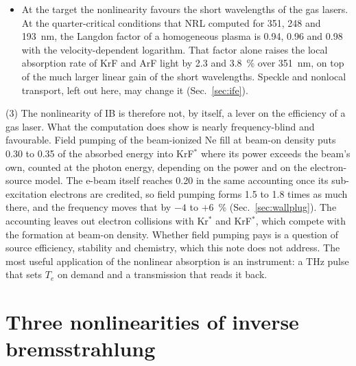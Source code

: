 \documentclass[11pt]{article}
\numberwithin{equation}{section}
\begin{document}
\begin{itemize}
  density it holds with that power the advantage is up to $\times1.24$ at a fixed beam
  current and $\times1.355$ at fixed $n_e$ (Sec.~\ref{sec:source}). The krypton
  share of a
  self-sustained discharge differs from its DC value by at most 1.5 percentage points
  in the Ne fill, and falls by up to ten points at high frequency in the Ar fill
  (Secs.~\ref{sec:share} and~\ref{sec:selfsus}).
\item At the target the nonlinearity favours the short wavelengths of the gas
  lasers. At the quarter-critical conditions that NRL computed for 351, 248 and
  193~nm, the Langdon factor of a homogeneous plasma is 0.94, 0.96 and 0.98 with the
  velocity-dependent logarithm. That factor alone raises the local absorption rate of
  KrF and ArF light by 2.3 and 3.8~\% over 351~nm, on top of the much larger linear
  gain of the short wavelengths. Speckle and nonlocal transport, left out here, may
  change it (Sec.~\ref{sec:ife}).
\end{itemize}

{\noindent}(3) The nonlinearity of IB is therefore not, by itself, a lever on
the efficiency of a gas laser. What the computation does show is nearly
frequency-blind and favourable. Field pumping of the beam-ionized Ne fill at beam-on
density puts 0.30 to 0.35 of the absorbed energy into KrF$^*$ where its power exceeds
the beam's own, counted at the photon energy, depending on the power and on the
electron-source model. The e-beam itself reaches 0.20 in the same accounting once its
sub-excitation electrons are credited, so field pumping forms 1.5 to 1.8 times as much
there, and the frequency moves that by $-4$ to $+6$~\% (Sec.~\ref{sec:wallplug}). The accounting leaves out electron collisions
with Kr$^*$ and KrF$^*$, which compete with the formation at beam-on density. Whether
field pumping pays is a question of source efficiency, stability and chemistry, which
this note does not address. The most useful
application of the nonlinear absorption is an instrument: a THz pulse that sets
$T_e$ on demand and a transmission that reads it back.

\section{Three nonlinearities of inverse bremsstrahlung}
\label{sec:three}
\end{document}
